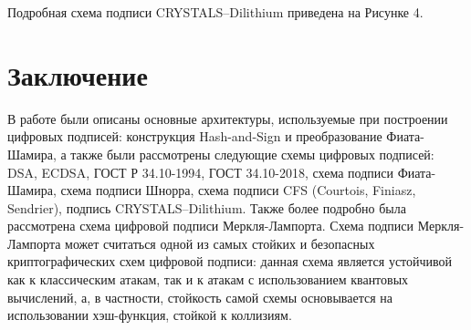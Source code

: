 \documentclass{./civarticle}
\begin{document}
Подробная схема подписи CRYSTALS–Dilithium приведена на Рисунке 4.

\begin{figure}[h!]
\end{figure}

\section{Заключение}

В работе были описаны основные архитектуры, используемые при построении цифровых подписей: конструкция Hash-and-Sign и преобразование Фиата-Шамира, а также были рассмотрены следующие схемы цифровых подписей: DSA, ECDSA, ГОСТ Р 34.10-1994, ГОСТ 34.10-2018, схема подписи Фиата-Шамира, схема подписи Шнорра, схема подписи CFS (Courtois, Finiasz, Sendrier), подпись CRYSTALS–Dilithium. Также более подробно была рассмотрена схема цифровой подписи Меркля-Лампорта. Схема подписи Меркля-Лампорта может считаться одной из самых стойких и безопасных криптографических схем цифровой подписи: данная схема является устойчивой как к классическим атакам, так и к атакам с использованием квантовых вычислений, а, в частности, стойкость самой схемы основывается на использовании хэш-функция, стойкой к коллизиям.
\end{document}
